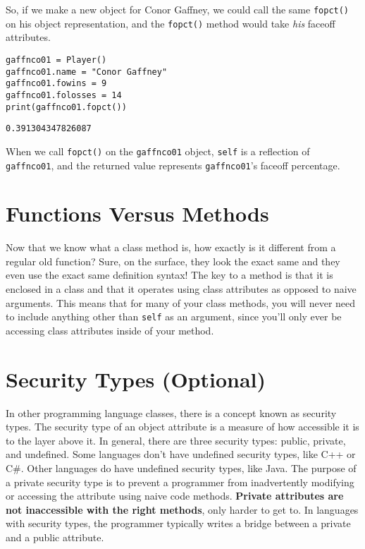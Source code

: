 So, if we make a new object for Conor Gaffney, we could call the same \verb|fopct()| on his object representation, and the \verb|fopct()| method would take \textit{his} faceoff attributes.
\begin{lstlisting}[style=pippython]
gaffnco01 = Player()
gaffnco01.name = "Conor Gaffney"
gaffnco01.fowins = 9
gaffnco01.folosses = 14
print(gaffnco01.fopct())
\end{lstlisting}
\begin{lstlisting}[style=none]
0.391304347826087
\end{lstlisting}
When we call \verb|fopct()| on the \verb|gaffnco01| object, \verb|self| is a reflection of \verb|gaffnco01|, and the returned value represents \verb|gaffnco01|'s faceoff percentage.
\section{Functions Versus Methods}
Now that we know what a class method is, how exactly is it different from a regular old function? Sure, on the surface, they look the exact same and they even use the exact same definition syntax! The key to a method is that it is enclosed in a class and that it operates using class attributes as opposed to naive arguments. This means that for many of your class methods, you will never need to include anything other than \verb|self| as an argument, since you'll only ever be accessing class attributes inside of your method. 
\section{Security Types (Optional)}
In other programming language classes, there is a concept known as security types. The security type of an object attribute is a measure of how accessible it is to the layer above it. In general, there are three security types: public, private, and undefined. Some languages don't have undefined security types, like C++ or C\#. Other languages do have undefined security types, like Java. The purpose of a private security type is to prevent a programmer from inadvertently modifying or accessing the attribute using naive code methods. \textbf{Private attributes are not inaccessible with the right methods}, only harder to get to. In languages with security types, the programmer typically writes a bridge between a private and a public attribute.
